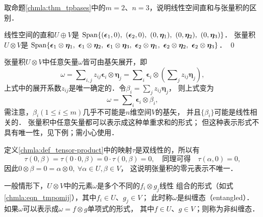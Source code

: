 \begin{example}
    取命题\ref{chmla:thm_tpbases}中的$m=2$、$n=3$，说明线性空间直和与张量积的区别．
\end{example}

线性空间的直和$U\oplus V$是
${\rm Span}\{(\boldsymbol{\epsilon}_1,0),\  (\boldsymbol{\epsilon}_2,0), \ 
(0,\boldsymbol{\eta}_1),\ (0,\boldsymbol{\eta}_2),\ (0,\boldsymbol{\eta}_3)\}$．
张量积$U\otimes V$是
${\rm Span}\{\boldsymbol{\epsilon}_1 \otimes \boldsymbol{\eta}_1,\ 
\boldsymbol{\epsilon}_1 \otimes \boldsymbol{\eta}_2,\ 
\boldsymbol{\epsilon}_1 \otimes \boldsymbol{\eta}_3,\ 
\boldsymbol{\epsilon}_2 \otimes \boldsymbol{\eta}_1,\ 
\boldsymbol{\epsilon}_2 \otimes \boldsymbol{\eta}_2,\ 
\boldsymbol{\epsilon}_2 \otimes \boldsymbol{\eta}_3\}$．
\qed



张量积$U\otimes V$中任意矢量$\omega$皆可由基矢展开，即
\begin{equation}\label{chmla:eqn_tmpomij}
    \omega = \sum\nolimits_{i,j} z_{ij} \boldsymbol{\epsilon}_i \otimes \boldsymbol{\eta}_j
    = \sum\nolimits_{i} \boldsymbol{\epsilon}_i \otimes  \left(\sum\nolimits_{j}z_{ij}\boldsymbol{\eta}_j\right),
\end{equation}
上式中的展开系数$z_{ij}$是唯一确定的．令$\beta_i = \sum_{j}z_{ij}\boldsymbol{\eta}_j$，
则上式变为
\begin{equation}\label{chmla:eqn_tmp67}
    \omega = \sum\nolimits_{i} \boldsymbol{\epsilon}_i \otimes  \beta _i ,
\end{equation}
需注意，$\beta_i(1\leqslant i \leqslant m)$几乎不可能是$n$维空间$V$的基矢，
并且$\{\beta_i\}$可能是线性相关的．
张量积中任意矢量都可以表示成这种单重求和的形式；
但这种表示形式不具有唯一性，见下例；需小心使用．
\begin{example}
    定义\ref{chmla:def_tensor-product}中的映射$\tau$是双线性的，所以有
    \begin{equation*}
        \tau(0,\beta)=\tau(0\cdot 0,\beta)=0\cdot \tau(0,\beta)=0,
        \quad \text{同理可得}\quad\tau(\alpha,0)=0 ,
    \end{equation*}
    因此$0 \otimes \beta =0=\alpha \otimes 0, \ \forall \alpha \in U, \beta \in V$，
    这说明张量积的零元表示不唯一．
\end{example}

一般情形下，$U\otimes V$中的元素$\omega$是多个不同的$f_i\otimes g_j$线性
组合的形式（如式\eqref{chmla:eqn_tmpomij}），其中$f_i\in U$、$g_j\in V$；
此时称$\omega$是{\heiti 纠缠态}（entangled）．    
如果$\omega$可以表示成$\omega=f\otimes g$单项式的形式，
其中$f\in U$、$g\in V$；则称为{\heiti 非纠缠态}．

